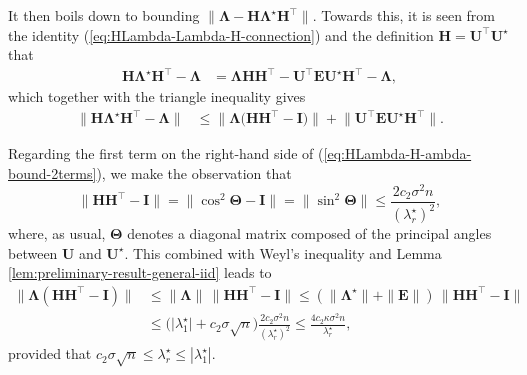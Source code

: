 It then boils down to bounding $\|\bm{\Lambda}-\bm{H}\bm{\Lambda}^{\star}\bm{H}^{\top}\|$.
Towards this, it is  seen from the identity (\ref{eq:HLambda-Lambda-H-connection})
and the definition $\bm{H}=\bm{U}^{\top}\bm{U}^{\star}$ that
%
\begin{align*}
\bm{H}\bm{\Lambda}^{\star}\bm{H}^{\top}-\bm{\Lambda} & =\bm{\Lambda}\bm{H}\bm{H}^{\top}-\bm{U}^{\top}\bm{E}\bm{U}^{\star}\bm{H}^{\top}-\bm{\Lambda},
\end{align*}
%
which together with the triangle inequality gives
%
\begin{align}
\big\|\bm{H}\bm{\Lambda}^{\star}\bm{H}^{\top}-\bm{\Lambda}\big\| & \leq\big\|\bm{\Lambda}\big(\bm{H}\bm{H}^{\top}-\bm{I}\big)\big\|+\big\|\bm{U}^{\top}\bm{E}\bm{U}^{\star}\bm{H}^{\top}\big\|.
	\label{eq:HLambda-H-ambda-bound-2terms}
\end{align}
%


Regarding the first term on the right-hand side of (\ref{eq:HLambda-H-ambda-bound-2terms}), we make the observation that
%
\[
\|\bm{H}\bm{H}^{\top}-\bm{I}\|=\|\cos^{2}\bm{\Theta}-\bm{I}\|=\|\sin^{2}\bm{\Theta}\|\leq\frac{2c_{2}\sigma^{2}n}{(\lambda_{r}^{\star})^{2}},
\]
%
where, as usual, $\bm{\Theta}$ denotes a diagonal matrix composed
of the principal angles between $\bm{U}$ and $\bm{U}^{\star}$. This
combined with Weyl's inequality and Lemma \ref{lem:preliminary-result-general-iid} leads to
%
\begin{align}
\|\bm{\Lambda}(\bm{H}\bm{H}^{\top}-\bm{I})\| & \leq\|\bm{\Lambda}\|\,\|\bm{H}\bm{H}^{\top}-\bm{I}\|\leq(\|\bm{\Lambda}^{\star}\|+\|\bm{E}\|)\,\|\bm{H}\bm{H}^{\top}-\bm{I}\|\nonumber \\
 & \leq\big(\big|\lambda_{1}^{\star}\big|+c_{2}\sigma\sqrt{n}\big)\frac{2c_{2}\sigma^{2}n}{(\lambda_{r}^{\star})^{2}}\leq\frac{4c_{2}\kappa\sigma^{2}n}{\lambda_{r}^{\star}},
\label{eq:Lambda-HHT-I-bound}
\end{align}
%
provided that $c_{2}\sigma\sqrt{n}\leq\lambda_{r}^{\star}\leq|\lambda_{1}^{\star}|$.




